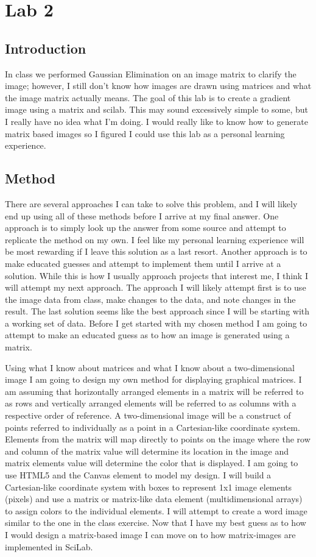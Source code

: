 \section{Lab 2}
\subsection{Introduction}
In class we performed Gaussian Elimination on an image matrix to clarify the image; however, I still don't know how images are drawn using matrices and what the image matrix actually means. The goal of this lab is to create a gradient image using a matrix and scilab. This may sound excessively simple to some, but I really have no idea what I'm doing. I would really like to know how to generate matrix based images so I figured I could use this lab as a personal learning experience.

\subsection{Method}
There are several approaches I can take to solve this problem, and I will likely end up using all of these methods before I arrive at my final answer. One approach is to simply look up the answer from some source and attempt to replicate the method on my own. I feel like my personal learning experience will be most rewarding if I leave this solution as a last resort. Another approach is to make educated guesses and attempt to implement them until I arrive at a solution. While this is how I usually approach projects that interest me, I think I will attempt my next approach. The approach I will likely attempt first is to use the image data from class, make changes to the data, and note changes in the result. The last solution seems like the best approach since I will be starting with a working set of data. Before I get started with my chosen method I am going to attempt to make an educated guess as to how an image is generated using a matrix.

Using what I know about matrices and what I know about a two-dimensional image I am going to design my own method for displaying graphical matrices. I am assuming that horizontally arranged elements in a matrix will be referred to as rows and vertically arranged elements will be referred to as columns with a respective order of reference. A two-dimensional image will be a construct of points referred to individually as a point in a Cartesian-like coordinate system. Elements from the matrix will map directly to points on the image where the row and column of the matrix value will determine its location in the image and matrix elements value will determine the color that is displayed. I am going to use HTML5 and the Canvas element to model my design. I will build a Cartesian-like coordinate system with boxes to represent 1x1 image elements (pixels) and use a matrix or matrix-like data element (multidimensional arrays) to assign colors to the individual elements. I will attempt to create a word image similar to the one in the class exercise. Now that I have my best guess as to how I would design a matrix-based image I can move on to how matrix-images are implemented in SciLab.

